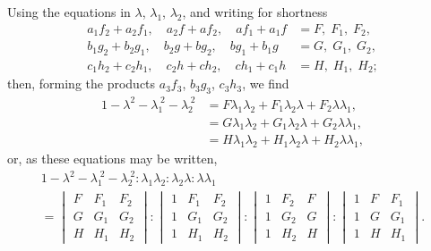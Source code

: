 \documentclass[11pt,a4paper]{book}
\begin{document}
Using the equations in $\lambda$, $\lambda_1$, $\lambda_2$, and writing for shortness
\begin{align*}
a_1f_2 + a_2f_1,\quad a_2f + af_2,\quad af_1 + a_1f &= F,\;F_1,\;F_2,\\
b_1g_2 + b_2g_1,\quad b_2g + bg_2,\quad bg_1 + b_1g &= G,\;G_1,\;G_2,\\
c_1h_2 + c_2h_1,\quad c_2h + ch_2,\quad ch_1 + c_1h &= H,\;H_1,\;H_2;
\end{align*}
then, forming the products $a_3f_3$, $b_3g_3$, $c_3h_3$, we find
\begin{align*}
1 - \lambda^2 - \lambda_1^{\;2} - \lambda_2^{\;2} &= F\lambda_1\lambda_2 + F_1\lambda_2\lambda + F_2\lambda\lambda_1,\\
&= G\lambda_1\lambda_2 + G_1\lambda_2\lambda + G_2\lambda\lambda_1,\\
&= H\lambda_1\lambda_2 + H_1\lambda_2\lambda + H_2\lambda\lambda_1,
\end{align*}
or, as these equations may be written,
\begin{multline*}
1 - \lambda^2 - \lambda_1^{\;2} - \lambda_2^{\;2} : \lambda_1\lambda_2 : \lambda_2\lambda : \lambda\lambda_1\\
= \begin{vmatrix} F & F_1 & F_2 \\ G & G_1 & G_2 \\ H & H_1 & H_2 \end{vmatrix}
: \begin{vmatrix} 1 & F_1 & F_2 \\ 1 & G_1 & G_2 \\ 1 & H_1 & H_2 \end{vmatrix}
: \begin{vmatrix} 1 & F_2 & F \\ 1 & G_2 & G \\ 1 & H_2 & H \end{vmatrix}
: \begin{vmatrix} 1 & F & F_1 \\ 1 & G & G_1 \\ 1 & H & H_1 \end{vmatrix}.
\end{multline*}
\end{document}
